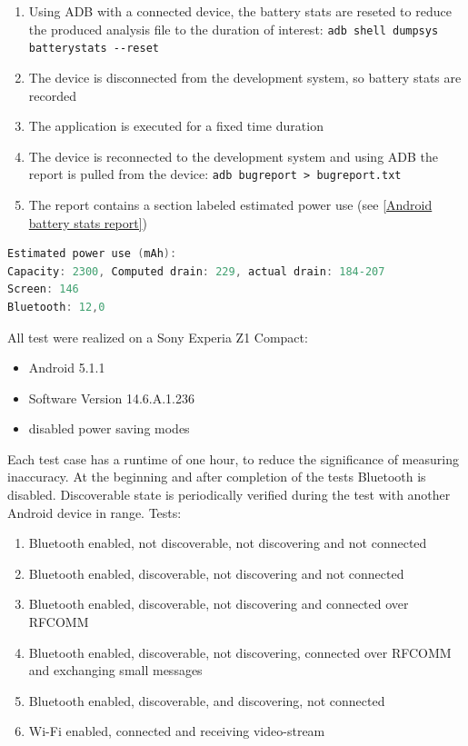 \begin{enumerate}
	\item Using \gls{ADB} with a connected device, the battery stats are reseted to reduce the produced analysis file to the duration of interest: \lstinline|adb shell dumpsys batterystats --reset|
	\item The device is disconnected from the development system, so battery stats are recorded
	\item The application is executed for a fixed time duration
	\item The device is reconnected to the development system and using \gls{ADB} the report is pulled from the device: \lstinline|adb bugreport > bugreport.txt|
	\item The report contains a section labeled estimated power use (see \autoref{Android battery stats report})
\end{enumerate}
  
\begin{lstlisting}[language=C, caption={Android battery stats report}, label={Android battery stats report}]
Estimated power use (mAh):
Capacity: 2300, Computed drain: 229, actual drain: 184-207
Screen: 146
Bluetooth: 12,0
\end{lstlisting}
  
All test were realized on a Sony Experia Z1 Compact:
\begin{itemize}
	\item Android 5.1.1
	\item Software Version 14.6.A.1.236
	\item disabled power saving modes
\end{itemize}   

Each test case has a runtime of one hour, to reduce the significance of measuring inaccuracy. At the beginning and after completion of the tests Bluetooth is disabled. Discoverable state is periodically verified during the test with another Android device in range. Tests:

\begin{enumerate}
	\item Bluetooth enabled, not discoverable, not discovering and not connected
	\item Bluetooth enabled, discoverable, not discovering and not connected
	\item Bluetooth enabled, discoverable, not discovering and connected over \gls{RFCOMM}
	\item Bluetooth enabled, discoverable, not discovering, connected over \gls{RFCOMM} and exchanging small messages
	\item Bluetooth enabled, discoverable, and discovering, not connected
	\item Wi-Fi enabled, connected and receiving video-stream
\end{enumerate}

